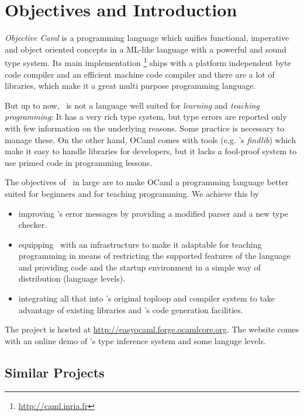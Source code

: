 
\section{Objectives and Introduction}
\label{sec:intro}

\label{hd001}
\textsl{Objective Caml} \citep{leroy2008} is a programming language which unifies 
functional, imperative and object oriented concepts in a ML-like 
language with a powerful and sound type system.  Its main implementation%
\footnote{\url{http://caml.inria.fr}} ships with a platform independent byte code
compiler and an efficient machine code compiler and there are a lot of
libraries, which make it a great multi purpose programming language.

But up to now, \ocaml\ is not a language well suited for \emph{learning} and
\emph{teaching programming}:
It has a very rich type system, but type errors are reported only with few
information on the underlying reasons.
Some practice is necessary to manage these.
On the other hand, OCaml comes with tools (e.g.  \citeauthor{stolpmann}'s
\emph{findlib}) which make it easy to handle libraries for developers, but it
lacks a fool-proof system to use primed code in programming lessons.

The objectives of \easyocaml\ in large are to make OCaml a programming language
better suited for beginners and for teaching programming. We achieve this by

\begin{itemize}
    \item improving \ocaml's error messages by providing a modified 
        parser and a new type checker.
    \item equipping \ocaml\ with an infrastructure to make it 
        adaptable for teaching programming in means of restricting the
        supported features of the language and providing code and the 
        startup environment in a simple way of distribution (language 
        levels).
    \item integrating all that into \ocaml's original toploop and 
        compiler system to take advantage of existing libraries and 
        \ocaml's code generation facilities.
\end{itemize}
The project is hosted at \url{http://easyocaml.forge.ocamlcore.org}.
The website comes with an online demo of \easyocaml's type inference system and
some languge levels.

\subsection*{Similar Projects}

